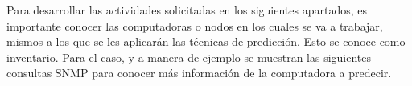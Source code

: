 Para desarrollar las actividades solicitadas en los siguientes apartados, es importante conocer las computadoras o nodos en los cuales se va a trabajar, mismos a los que se les aplicarán las técnicas de predicción. Esto se conoce como inventario. Para el caso, y a manera de ejemplo se muestran las siguientes consultas SNMP para conocer más información de la computadora a predecir. 

